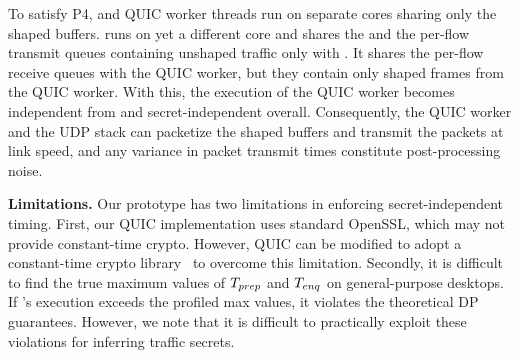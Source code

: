 To satisfy P4,
{\prepare} and QUIC worker threads run on separate cores
sharing only the shaped buffers.
{\ushaper} runs on yet a different core and shares the {\flowmap} and the
per-flow transmit queues containing unshaped traffic only with {\prepare}. It
shares the per-flow receive queues with the QUIC worker, but they contain only
shaped frames from the QUIC worker.
With this, the execution of the QUIC worker becomes independent from {\prepare}
and secret-independent overall.
%
Consequently, the QUIC worker and the UDP stack can packetize the shaped buffers
and transmit the packets at link speed, and any variance in packet
transmit times constitute post-processing noise.

\textbf{Limitations.}
Our prototype has two limitations in enforcing secret-independent timing.
First, our QUIC implementation uses
standard OpenSSL, which may not provide constant-time crypto. However, QUIC can
be modified to adopt a constant-time crypto library~\cite{hacl,libsecp256k1} to
overcome this limitation.
Secondly, it is difficult to find the true maximum values of
$T_{prep}$ and $T_{enq}$ on general-purpose desktops. If
{\prepare}'s execution exceeds the profiled max values, it violates the
theoretical DP guarantees. However, we note that it is difficult to practically
exploit these violations for inferring traffic secrets.

